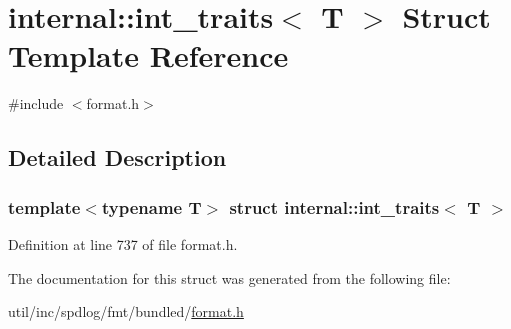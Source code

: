 \hypertarget{structinternal_1_1int__traits}{}\section{internal\+:\+:int\+\_\+traits$<$ T $>$ Struct Template Reference}
\label{structinternal_1_1int__traits}


{\ttfamily \#include $<$format.\+h$>$}



\subsection{Detailed Description}
\subsubsection*{template$<$typename T$>$\newline
struct internal\+::int\+\_\+traits$<$ T $>$}



Definition at line 737 of file format.\+h.



The documentation for this struct was generated from the following file\+:\begin{DoxyCompactItemize}
\item 
util/inc/spdlog/fmt/bundled/\hyperlink{format_8h}{format.\+h}\end{DoxyCompactItemize}
